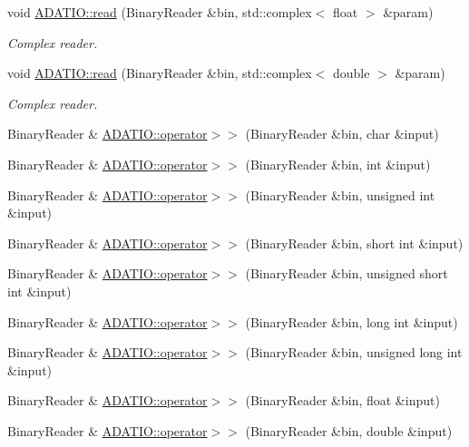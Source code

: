 \begin{DoxyCompactItemize}
void \mbox{\hyperlink{namespaceADATIO_aa439c7d6dfc63d8424816de24810141d}{A\+D\+A\+T\+I\+O\+::read}} (Binary\+Reader \&bin, std\+::complex$<$ float $>$ \&param)
\begin{DoxyCompactList}\small\item\em Complex reader. \end{DoxyCompactList}\item 
void \mbox{\hyperlink{namespaceADATIO_a99479bf376afa5196fad6684a360c7af}{A\+D\+A\+T\+I\+O\+::read}} (Binary\+Reader \&bin, std\+::complex$<$ double $>$ \&param)
\begin{DoxyCompactList}\small\item\em Complex reader. \end{DoxyCompactList}\item 
Binary\+Reader \& \mbox{\hyperlink{namespaceADATIO_aa4d9d42917828a10055400b295736ad5}{A\+D\+A\+T\+I\+O\+::operator$>$$>$}} (Binary\+Reader \&bin, char \&input)
\item 
Binary\+Reader \& \mbox{\hyperlink{namespaceADATIO_a38e9b56ea3dfb8ea19ceb57783546c7c}{A\+D\+A\+T\+I\+O\+::operator$>$$>$}} (Binary\+Reader \&bin, int \&input)
\item 
Binary\+Reader \& \mbox{\hyperlink{namespaceADATIO_ae8319d36de40198210e78469c672e6d0}{A\+D\+A\+T\+I\+O\+::operator$>$$>$}} (Binary\+Reader \&bin, unsigned int \&input)
\item 
Binary\+Reader \& \mbox{\hyperlink{namespaceADATIO_af1565fd78ef164ff9cd892d032189f03}{A\+D\+A\+T\+I\+O\+::operator$>$$>$}} (Binary\+Reader \&bin, short int \&input)
\item 
Binary\+Reader \& \mbox{\hyperlink{namespaceADATIO_a1252900b43fa1caf87beea30ea4d5d76}{A\+D\+A\+T\+I\+O\+::operator$>$$>$}} (Binary\+Reader \&bin, unsigned short int \&input)
\item 
Binary\+Reader \& \mbox{\hyperlink{namespaceADATIO_ab87e32e5cce14b02718ac9c25a238bdd}{A\+D\+A\+T\+I\+O\+::operator$>$$>$}} (Binary\+Reader \&bin, long int \&input)
\item 
Binary\+Reader \& \mbox{\hyperlink{namespaceADATIO_a60c265c9f81ae202821e863e6db5f56f}{A\+D\+A\+T\+I\+O\+::operator$>$$>$}} (Binary\+Reader \&bin, unsigned long int \&input)
\item 
Binary\+Reader \& \mbox{\hyperlink{namespaceADATIO_a61d7b17123532c52a896c68a7524e924}{A\+D\+A\+T\+I\+O\+::operator$>$$>$}} (Binary\+Reader \&bin, float \&input)
\item 
Binary\+Reader \& \mbox{\hyperlink{namespaceADATIO_a2f66b1bc36b75ce131795f596985e5dc}{A\+D\+A\+T\+I\+O\+::operator$>$$>$}} (Binary\+Reader \&bin, double \&input)

\end{DoxyCompactItemize}
